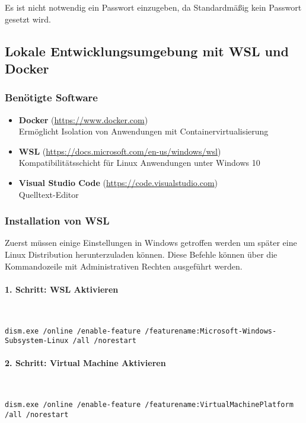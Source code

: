 Es ist nicht notwendig ein Passwort einzugeben, da Standardmäßig kein Passwort
gesetzt wird.

\subsection{Lokale Entwicklungsumgebung mit WSL und Docker}

\subsubsection{Benötigte Software}

\begin{itemize}
  \item \textbf{Docker} (\url{https://www.docker.com}) \\ Ermöglicht Isolation
  von Anwendungen mit Containervirtualisierung
  \item \textbf{WSL} (\url{https://docs.microsoft.com/en-us/windows/wsl}) \\
  Kompatibilitätsschicht für Linux Anwendungen unter Windows 10
  \item \textbf{Visual Studio Code} (\url{https://code.visualstudio.com}) \\
  Quelltext-Editor
\end{itemize}

\subsubsection{Installation von WSL}
Zuerst müssen einige Einstellungen in Windows getroffen werden um später eine
Linux Distribution herunterzuladen können. Diese Befehle können über die
Kommandozeile mit Administrativen Rechten ausgeführt werden.

\paragraph{1. Schritt: WSL Aktivieren}\mbox{}\\
\begin{lstlisting}[caption={WSL Feature Feature aktivierens}]
  dism.exe /online /enable-feature /featurename:Microsoft-Windows-Subsystem-Linux /all /norestart
\end{lstlisting}

\paragraph{2. Schritt: Virtual Machine Aktivieren}\mbox{}\\
\begin{lstlisting}[caption={Virtual Machine Feature aktivieren}]
  dism.exe /online /enable-feature /featurename:VirtualMachinePlatform /all /norestart
\end{lstlisting}

